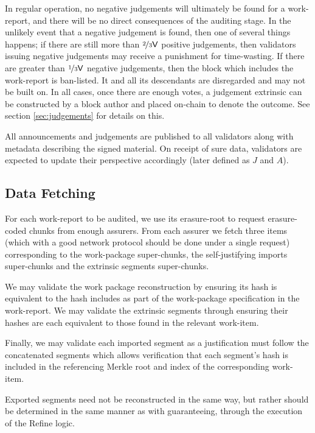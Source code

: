 In regular operation, no negative judgements will ultimately be found for a work-report, and there will be no direct consequences of the auditing stage. In the unlikely event that a negative judgement is found, then one of several things happens; if there are still more than $\nicefrac{2}{3}\mathsf{V}$ positive judgements, then validators issuing negative judgements may receive a punishment for time-wasting. If there are greater than $\nicefrac{1}{3}\mathsf{V}$ negative judgements, then the block which includes the work-report is ban-listed. It and all its descendants are disregarded and may not be built on. In all cases, once there are enough votes, a judgement extrinsic can be constructed by a block author and placed on-chain to denote the outcome. See section \ref{sec:judgements} for details on this.

All announcements and judgements are published to all validators along with metadata describing the signed material. On receipt of sure data, validators are expected to update their perspective accordingly (later defined as $J$ and $A$).

\subsection{Data Fetching}

For each work-report to be audited, we use its erasure-root to request erasure-coded chunks from enough assurers. From each assurer we fetch three items (which with a good network protocol should be done under a single request) corresponding to the work-package super-chunks, the self-justifying imports super-chunks and the extrinsic segments super-chunks.

We may validate the work package reconstruction by ensuring its hash is equivalent to the hash includes as part of the work-package specification in the work-report. We may validate the extrinsic segments through ensuring their hashes are each equivalent to those found in the relevant work-item.

Finally, we may validate each imported segment as a justification must follow the concatenated segments which allows verification that each segment's hash is included in the referencing Merkle root and index of the corresponding work-item.

Exported segments need not be reconstructed in the same way, but rather should be determined in the same manner as with guaranteeing, \ie through the execution of the Refine logic.

